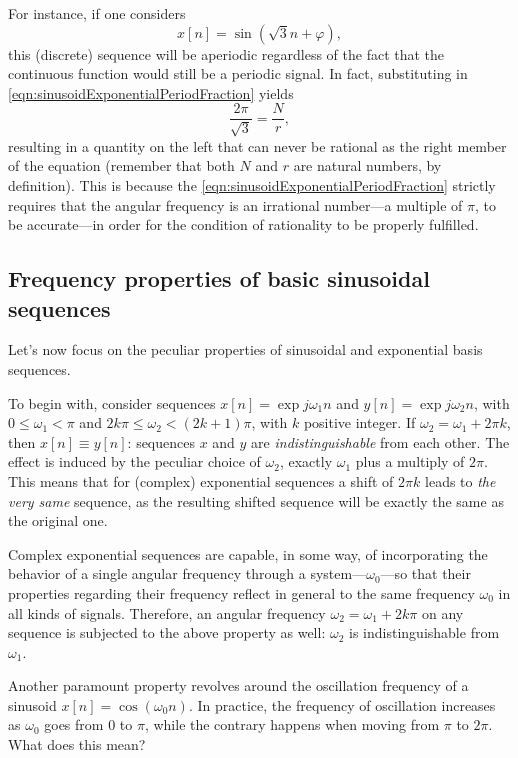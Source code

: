 \documentclass[\documentfontsize, twocolumn]{\classname}
\begin{document}
For instance, if one considers \[x[n] = \sin{(\sqrt{3}n + \varphi)},\] this (discrete) se\-quen\-ce will be aperiodic regardless of the fact that the continuous function would still be a periodic signal. In fact, substituting in \ref{eqn:sinusoidExponentialPeriodFraction} yields \[\frac{2\pi}{\sqrt{3}} = \frac N r,\] resulting in a quantity on the left that can never be rational as the right member of the equation (remember that both $N$ and $r$ are natural numbers, by definition). This is because the \ref{eqn:sinusoidExponentialPeriodFraction} strictly requires that the angular frequency is an irrational number---a multiple of $\pi$, to be accurate---in order for the condition of rationality to be properly fulfilled.

\subsection{Frequency properties of basic sinusoidal se\-quen\-ces}

Let's now focus on the peculiar properties of sinusoidal and exponential basis se\-quen\-ces.

To begin with, consider se\-quen\-ces $x[n] = \exp{j \omega_1 n}$ and $y[n] = \exp{j \omega_2 n}$, with $0 \leq \omega_1 < \pi$ and $2 k \pi \leq \omega_2 < (2k+1)\pi$, with $k$ positive integer. If $\omega_2 = \omega_1 + 2 \pi k$, then $x[n] \equiv y[n]$: se\-quen\-ces $x$ and $y$ are \emph{indistinguishable} from each other. The effect is induced by the peculiar choice of $\omega_2$, exactly $\omega_1$ plus a multiply of $2\pi$. This means that for (complex) exponential se\-quen\-ces a shift of $2\pi k$ leads to \emph{the very same} se\-quen\-ce, as the resulting shifted se\-quen\-ce will be exactly the same as the original one.

Complex exponential sequences are capable, in some way, of incorporating the behavior of a single angular frequency through a system---$\omega_0$---so that their properties regarding their frequency reflect in general to the same frequency $\omega_0$ in all kinds of signals. Therefore, an angular frequency $\omega_2 = \omega_1 + 2k \pi$ on any sequence is subjected to the above property as well: $\omega_2$ is indistinguishable from $\omega_1$.

Another paramount property revolves around the oscillation frequency of a sinusoid $x[n]=\cos{(\omega_0 n)}$. In practice, the frequency of oscillation increases as $\omega_0$ goes from $0$ to $\pi$, while the contrary happens when moving from $\pi$ to $2\pi$. What does this mean?
\end{document}
